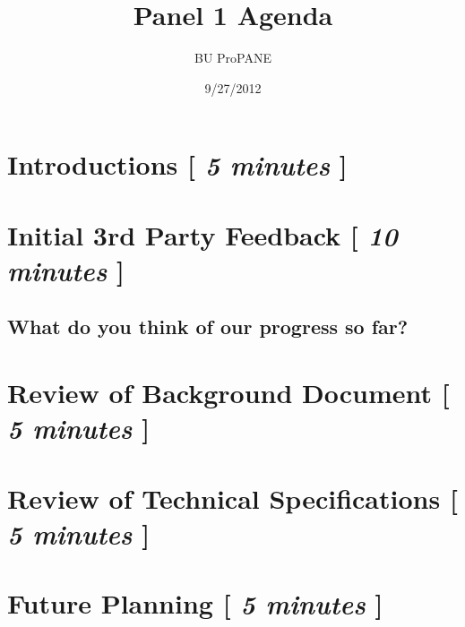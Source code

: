 \documentclass[]{article}
\newcommand{\comment}[1]{}
\begin{document}
\title{Panel 1 Agenda}
\date{9/27/2012}
\author{BU ProPANE}
\maketitle
	
	\thispagestyle{empty}
	\section{Introductions \hfill {\normalsize [ {\sl 5 minutes} ]}}
\comment{
		\subsection*{Team}
\begin{itemize}
\item Griffin Dunn
\item Colin Madigan
\item Phil Stahlfeld
\end{itemize}
		\subsection*{Clients}
\begin{itemize}
\item Dr. Doug Gabauer
\item Dr. Robert Midkiff
\end{itemize}
		\subsection*{Panel}
\begin{itemize}
\item{Dr. Matt Watkins}
\item{Dr. Richard Kozick}
\item{Dr. Michael Thompson}
\end{itemize}
}
	\section{Initial 3rd Party Feedback \hfill {\normalsize [ {\sl 10 minutes} ]}}
 \subsection*{What do you think of our progress so far?} 
\vspace{\baselineskip}

	\section{Review of Background Document \hfill {\normalsize [ {\sl 5 minutes} ]}}

	\section{Review of Technical Specifications \hfill {\normalsize [ {\sl 5 minutes} ]}} 

	\section{Future Planning \hfill {\normalsize [ {\sl 5 minutes} ]}} 
\end{document}
